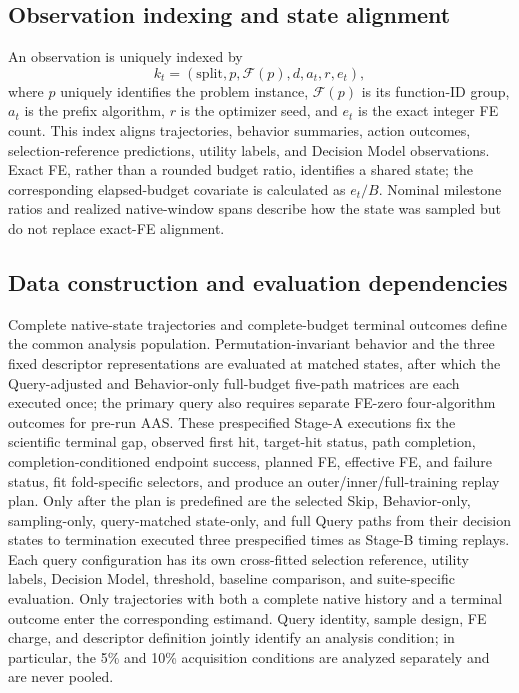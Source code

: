 \subsection{Observation indexing and state alignment}

An observation is uniquely indexed by
\begin{equation}
  k_t=(\mathrm{split},p,\mathcal{F}(p),d,a_t,r,e_t),
  \label{eq:state-key}
\end{equation}
where $p$ uniquely identifies the problem instance, $\mathcal{F}(p)$ is its
function-ID group, $a_t$ is the prefix algorithm,
$r$ is the optimizer seed, and $e_t$ is the exact integer FE count.  This index
aligns trajectories, behavior summaries, action outcomes, selection-reference
predictions, utility labels, and Decision Model observations.  Exact FE, rather
than a rounded budget ratio, identifies a shared state; the corresponding
elapsed-budget covariate is calculated as $e_t/B$.  Nominal milestone ratios and
realized native-window spans describe how the state was sampled but do not
replace exact-FE alignment.

\subsection{Data construction and evaluation dependencies}

Complete native-state trajectories and complete-budget terminal outcomes
define the common analysis population.  Permutation-invariant behavior and the
three fixed descriptor representations are evaluated at matched states, after
which the Query-adjusted and Behavior-only full-budget five-path matrices are
each executed once; the primary query also requires separate FE-zero
four-algorithm outcomes for pre-run AAS.  These prespecified Stage-A executions
fix the scientific terminal gap, observed first hit, target-hit status, path
completion, completion-conditioned endpoint success, planned FE, effective FE,
and failure status, fit fold-specific selectors, and produce an
outer/inner/full-training replay plan.  Only after the plan is predefined are the
selected Skip, Behavior-only, sampling-only, query-matched state-only, and full Query paths from their decision states to
termination executed three prespecified times as Stage-B timing replays.  Each
query configuration has its own cross-fitted selection reference, utility labels,
Decision Model, threshold, baseline comparison, and suite-specific evaluation.  Only
trajectories with both a complete native history and a terminal outcome enter
the corresponding estimand.  Query identity, sample design, FE charge, and
descriptor definition jointly identify an analysis condition; in particular,
the 5\% and 10\% acquisition conditions are analyzed separately and are never
pooled.

